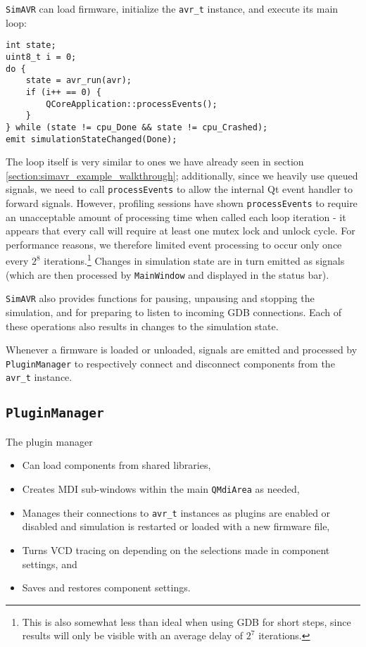 \lstinline|SimAVR| can load firmware, initialize the \lstinline|avr_t| instance,
and execute its main loop:

\begin{lstlisting}
int state;
uint8_t i = 0;
do {
    state = avr_run(avr);
    if (i++ == 0) {
        QCoreApplication::processEvents();
    }
} while (state != cpu_Done && state != cpu_Crashed);
emit simulationStateChanged(Done);
\end{lstlisting}

The loop itself is very similar to ones we have already seen in section
\ref{section:simavr_example_walkthrough}; additionally, since we heavily use
queued signals, we need to call \lstinline|processEvents| to allow the internal
Qt event handler to forward signals. However, profiling sessions have shown
\lstinline|processEvents| to require an unacceptable amount of processing time
when called each loop iteration - it appears that every call will require at least
one mutex lock and unlock cycle. For performance reasons, we therefore limited
event processing to occur only once every $2^8$ iterations.\footnote{
%
This is also somewhat less than ideal when using \ac{GDB} for short steps, since
results will only be visible with an average delay of $2^7$ iterations.
%
}
Changes in simulation state are in turn
emitted as signals (which are then processed by \lstinline|MainWindow| and
displayed in the status bar).

\lstinline|SimAVR| also provides functions for pausing, unpausing and stopping the
simulation, and for preparing \simavr to listen to incoming \ac{GDB} connections.
Each of these operations also results in changes to the simulation state.

Whenever a firmware is loaded or unloaded, signals are emitted and processed
by \lstinline|PluginManager| to respectively connect and disconnect components
from the \lstinline|avr_t| instance.


\subsection{\lstinline|PluginManager|}

The plugin manager

\begin{itemize}
\item Can load components from shared libraries,
\item Creates \ac{MDI} sub-windows within the main \lstinline|QMdiArea| as needed,
\item Manages their connections to \lstinline|avr_t| instances as plugins are
      enabled or disabled and simulation is restarted or loaded with a new firmware
      file,
\item Turns \ac{VCD} tracing on depending on the selections made in component
      settings, and
\item Saves and restores component settings.
\end{itemize}

